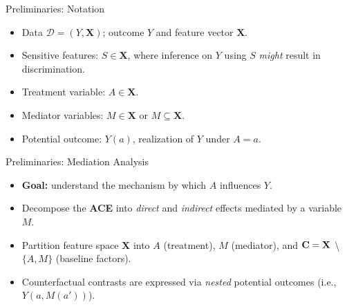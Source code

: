 \documentclass[12pt,t,handout]{beamer}
\newcommand{\D}{\mathcal{D}}
\begin{document}

\begin{frame}[c]{Preliminaries: Notation}

\begin{center}
\begin{itemize}
  \itemsep10pt
  \item Data $\D = (Y, \bm{X})$; outcome $Y$ and feature vector $\bm{X}$.
  \item Sensitive features: $S \in \bm{X}$, where inference on $Y$ using $S$
    \textit{might} result in discrimination.
  \item Treatment variable: $A \in \bm{X}$.
  \item Mediator variables: $M \in \bm{X}$ or $M \subseteq \bm{X}$.
  \item Potential outcome: $Y(a)$, realization of $Y$ under $A = a$.
\end{itemize}
\end{center}


\end{frame}


\begin{frame}[c]{Preliminaries: Mediation Analysis}

\begin{center}
\begin{itemize}
  \itemsep10pt
  \item \textbf{Goal:} understand the mechanism by which $A$ influences $Y$.
  \item Decompose the \textbf{ACE} into \textit{direct} and \textit{indirect}
    effects mediated by a variable $M$.
  \item Partition feature space $\bm{X}$ into $A$ (treatment), $M$ (mediator),
    and $\bf{C} = \bm{X}$ \textbackslash \hspace{0.05em} $\{A, M\}$ (baseline
    factors).
  \item Counterfactual contrasts are expressed via \textit{nested} potential
    outcomes (i.e., $Y(a, M(a'))$).
\end{itemize}
\end{center}


\end{frame}
\end{document}
